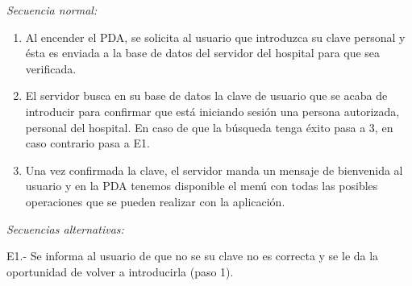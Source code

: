 \documentclass[12pt,a4paper,notitlepage,twoside]{report}
\begin{document}
\emph{Secuencia normal:} 
\begin{enumerate}
\item Al encender el PDA, se solicita al usuario que introduzca su clave personal y \'esta es enviada a la base de datos del servidor del hospital para que sea verificada.
\item El servidor busca en su base de datos la clave de usuario que se acaba de introducir para confirmar que est\'a iniciando sesi\'on una persona autorizada, personal del hospital. En caso de que la b\'usqueda tenga \'exito pasa a 3, en caso contrario pasa a E1.
\item Una vez confirmada la clave, el servidor manda un mensaje de bienvenida al usuario y en la PDA tenemos disponible el men\'u con todas las posibles operaciones que se pueden realizar con la aplicaci\'on.
\end{enumerate}
\emph{Secuencias alternativas:}
\begin{description}
\item E1.- Se informa al usuario de que no se su clave no es correcta y se le da la oportunidad de volver a introducirla (paso 1).
\end{description}
\end{document}
